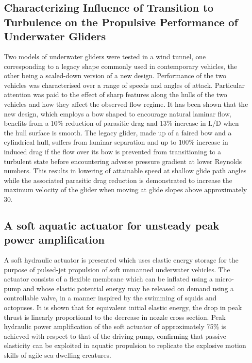 \documentclass[a4paper,10pt]{article}
\begin{document}
\subsection{Characterizing Influence of Transition to Turbulence on the Propulsive Performance of Underwater Gliders \cite{Lidtke2019}}

	Two models of underwater gliders were tested in a wind tunnel, one corresponding to a legacy shape commonly used in contemporary vehicles, the other being a scaled-down version of a new design. Performance of the two vehicles was characterised over a range of speeds and angles of attack. Particular attention was paid to the effect of sharp features along the hulls of the two vehicles and how they affect the observed flow regime. It has been shown that the new design, which employs a bow shaped to encourage natural laminar flow, benefits from a 10\% reduction of parasitic drag and 13\% increase in L/D when the hull surface is smooth. The legacy glider, made up of a faired bow and a cylindrical hull, suffers from laminar separation and up to 100\% increase in induced drag if the flow over its bow is prevented from transitioning to a turbulent state before encountering adverse pressure gradient at lower Reynolds numbers. This results in lowering of attainable speed at shallow glide path angles while the associated parasitic drag reduction is demonstrated to increase the maximum velocity of the glider when moving at glide slopes above approximately 30.

\subsection{A soft aquatic actuator for unsteady peak power amplification \cite{GiorgioSerchi2018}}

	A soft hydraulic actuator is presented which uses elastic energy storage for the purpose of pulsed-jet propulsion of soft unmanned underwater vehicles. The actuator consists of a flexible membrane which can be inflated using a micro-pump and whose elastic potential energy may be released on demand using a controllable valve, in a manner inspired by the swimming of squids and octopuses. It is shown that for equivalent initial elastic energy, the drop in peak thrust is linearly proportional to the decrease in nozzle cross section. Peak hydraulic power amplification of the soft actuator of approximately 75\% is achieved with respect to that of the driving pump, confirming that passive elasticity can be exploited in aquatic propulsion to replicate the explosive motion skills of agile sea-dwelling creatures.
\end{document}
